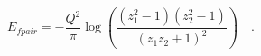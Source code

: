 \begin{equation}
E_{fpair} = -\frac{Q^2}{\pi} \log\left(\frac{(z_1^2-1)(z_2^2-1)}{(z_1z_2+1)^2}\right)\quad.
\end{equation}

